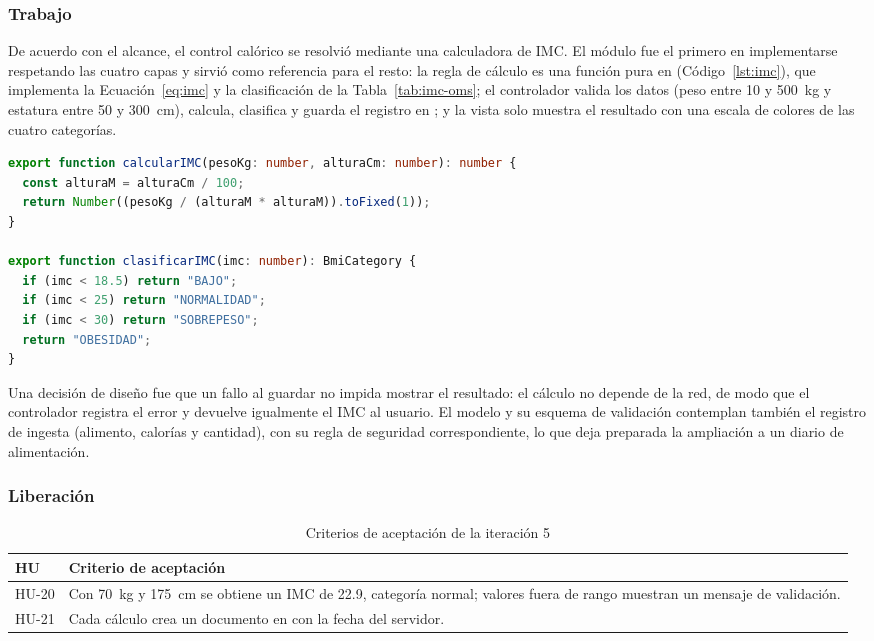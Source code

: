 \subsubsection{Trabajo}

De acuerdo con el alcance, el control calórico se resolvió mediante una
calculadora de IMC. El módulo fue el primero en implementarse respetando las
cuatro capas y sirvió como referencia para el resto: la regla de cálculo es
una función pura en 
(Código~\ref{lst:imc}), que implementa la Ecuación~\ref{eq:imc} y la
clasificación de la Tabla~\ref{tab:imc-oms}; el controlador
 valida los datos (peso entre 10 y 500~kg y
estatura entre 50 y 300~cm), calcula, clasifica y guarda el registro en
; y la vista solo muestra el
resultado con una escala de colores de las cuatro categorías.

\begin{lstlisting}[language=TypeScript, caption={Cálculo y clasificación del IMC}, label={lst:imc}]
export function calcularIMC(pesoKg: number, alturaCm: number): number {
  const alturaM = alturaCm / 100;
  return Number((pesoKg / (alturaM * alturaM)).toFixed(1));
}

export function clasificarIMC(imc: number): BmiCategory {
  if (imc < 18.5) return "BAJO";
  if (imc < 25) return "NORMALIDAD";
  if (imc < 30) return "SOBREPESO";
  return "OBESIDAD";
}
\end{lstlisting}

Una decisión de diseño fue que un fallo al guardar no impida mostrar el
resultado: el cálculo no depende de la red, de modo que el controlador
registra el error y devuelve igualmente el IMC al usuario. El modelo
 y su esquema de validación contemplan también
el registro de ingesta (alimento, calorías y cantidad), con su regla de
seguridad correspondiente, lo que deja preparada la ampliación a un diario de
alimentación.

\subsubsection{Liberación}

\begin{table}[H]
\centering
\caption{Criterios de aceptación de la iteración 5}
\label{tab:ca-it5}
\begin{tabularx}{\textwidth}{|L{1.3cm}|Y|}
\hline
{} \textbf{HU} & \textbf{Criterio de aceptación} \\
\hline
HU-20 & Con 70~kg y 175~cm se obtiene un IMC de 22.9, categoría normal;
valores fuera de rango muestran un mensaje de validación. \\ \hline
HU-21 & Cada cálculo crea un documento en
 con la fecha del servidor. \\
\hline
\end{tabularx}
\end{table}

